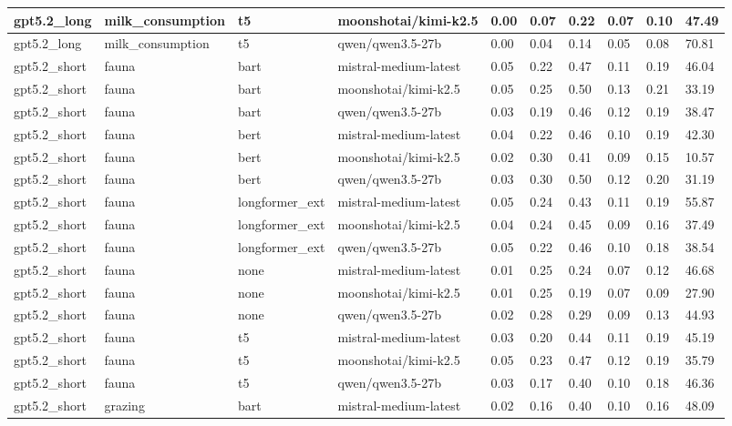\begin{tabular}{|l|l|l|l|l|l|l|l|l|l|}
 \hline
 gpt5.2\_long & milk\_consumption & t5 & moonshotai/kimi-k2.5 & 0.00 & 0.07 & 0.22 & 0.07 & 0.10 & 47.49 \\
 \hline
 gpt5.2\_long & milk\_consumption & t5 & qwen/qwen3.5-27b & 0.00 & 0.04 & 0.14 & 0.05 & 0.08 & 70.81 \\
 \hline
 gpt5.2\_short & fauna & bart & mistral-medium-latest & 0.05 & 0.22 & 0.47 & 0.11 & 0.19 & 46.04 \\
 \hline
 gpt5.2\_short & fauna & bart & moonshotai/kimi-k2.5 & 0.05 & 0.25 & 0.50 & 0.13 & 0.21 & 33.19 \\
 \hline
 gpt5.2\_short & fauna & bart & qwen/qwen3.5-27b & 0.03 & 0.19 & 0.46 & 0.12 & 0.19 & 38.47 \\
 \hline
 gpt5.2\_short & fauna & bert & mistral-medium-latest & 0.04 & 0.22 & 0.46 & 0.10 & 0.19 & 42.30 \\
 \hline
 gpt5.2\_short & fauna & bert & moonshotai/kimi-k2.5 & 0.02 & 0.30 & 0.41 & 0.09 & 0.15 & 10.57 \\
 \hline
 gpt5.2\_short & fauna & bert & qwen/qwen3.5-27b & 0.03 & 0.30 & 0.50 & 0.12 & 0.20 & 31.19 \\
 \hline
 gpt5.2\_short & fauna & longformer\_ext & mistral-medium-latest & 0.05 & 0.24 & 0.43 & 0.11 & 0.19 & 55.87 \\
 \hline
 gpt5.2\_short & fauna & longformer\_ext & moonshotai/kimi-k2.5 & 0.04 & 0.24 & 0.45 & 0.09 & 0.16 & 37.49 \\
 \hline
 gpt5.2\_short & fauna & longformer\_ext & qwen/qwen3.5-27b & 0.05 & 0.22 & 0.46 & 0.10 & 0.18 & 38.54 \\
 \hline
 gpt5.2\_short & fauna & none & mistral-medium-latest & 0.01 & 0.25 & 0.24 & 0.07 & 0.12 & 46.68 \\
 \hline
 gpt5.2\_short & fauna & none & moonshotai/kimi-k2.5 & 0.01 & 0.25 & 0.19 & 0.07 & 0.09 & 27.90 \\
 \hline
 gpt5.2\_short & fauna & none & qwen/qwen3.5-27b & 0.02 & 0.28 & 0.29 & 0.09 & 0.13 & 44.93 \\
 \hline
 gpt5.2\_short & fauna & t5 & mistral-medium-latest & 0.03 & 0.20 & 0.44 & 0.11 & 0.19 & 45.19 \\
 \hline
 gpt5.2\_short & fauna & t5 & moonshotai/kimi-k2.5 & 0.05 & 0.23 & 0.47 & 0.12 & 0.19 & 35.79 \\
 \hline
 gpt5.2\_short & fauna & t5 & qwen/qwen3.5-27b & 0.03 & 0.17 & 0.40 & 0.10 & 0.18 & 46.36 \\
 \hline
 gpt5.2\_short & grazing & bart & mistral-medium-latest & 0.02 & 0.16 & 0.40 & 0.10 & 0.16 & 48.09 \\

\end{tabular}
